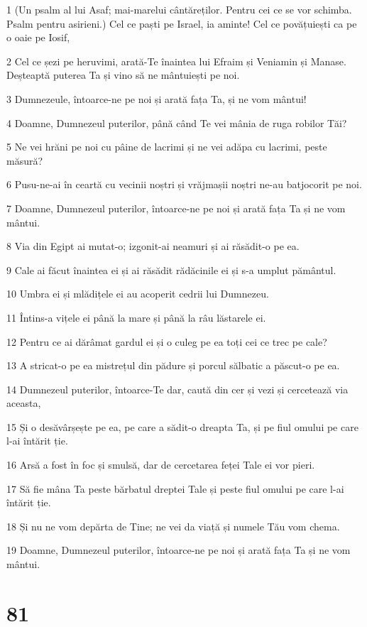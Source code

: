 \par 1 (Un psalm al lui Asaf; mai-marelui cântăreților. Pentru cei ce se vor schimba. Psalm pentru asirieni.) Cel ce paști pe Israel, ia aminte! Cel ce povățuiești ca pe o oaie pe Iosif,
\par 2 Cel ce șezi pe heruvimi, arată-Te înaintea lui Efraim și Veniamin și Manase. Deșteaptă puterea Ta și vino să ne mântuiești pe noi.
\par 3 Dumnezeule, întoarce-ne pe noi și arată fața Ta, și ne vom mântui!
\par 4 Doamne, Dumnezeul puterilor, până când Te vei mânia de ruga robilor Tăi?
\par 5 Ne vei hrăni pe noi cu pâine de lacrimi și ne vei adăpa cu lacrimi, peste măsură?
\par 6 Pusu-ne-ai în ceartă cu vecinii noștri și vrăjmașii noștri ne-au batjocorit pe noi.
\par 7 Doamne, Dumnezeul puterilor, întoarce-ne pe noi și arată fața Ta și ne vom mântui.
\par 8 Via din Egipt ai mutat-o; izgonit-ai neamuri și ai răsădit-o pe ea.
\par 9 Cale ai făcut înaintea ei și ai răsădit rădăcinile ei și s-a umplut pământul.
\par 10 Umbra ei și mlădițele ei au acoperit cedrii lui Dumnezeu.
\par 11 Întins-a vițele ei până la mare și până la râu lăstarele ei.
\par 12 Pentru ce ai dărâmat gardul ei și o culeg pe ea toți cei ce trec pe cale?
\par 13 A stricat-o pe ea mistrețul din pădure și porcul sălbatic a păscut-o pe ea.
\par 14 Dumnezeul puterilor, întoarce-Te dar, caută din cer și vezi și cercetează via aceasta,
\par 15 Și o desăvârșește pe ea, pe care a sădit-o dreapta Ta, și pe fiul omului pe care l-ai întărit ție.
\par 16 Arsă a fost în foc și smulsă, dar de cercetarea feței Tale ei vor pieri.
\par 17 Să fie mâna Ta peste bărbatul dreptei Tale și peste fiul omului pe care l-ai întărit ție.
\par 18 Și nu ne vom depărta de Tine; ne vei da viață și numele Tău vom chema.
\par 19 Doamne, Dumnezeul puterilor, întoarce-ne pe noi și arată fața Ta și ne vom mântui.

\chapter{81}

